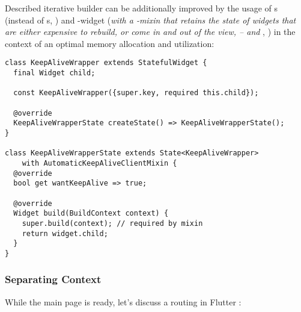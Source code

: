 \hspace{0.5cm}
\hspace{1cm}

\noindent Described iterative builder can be additionally improved by the usage of s (instead of s, 
) and -widget (\emph{with a -mixin that retains the 
state of widgets that are either expensive to rebuild, or come in and out of the view, --  and 
}, ) in the context of an optimal memory allocation and utilization:

\begin{lstlisting}
class KeepAliveWrapper extends StatefulWidget {
  final Widget child;

  const KeepAliveWrapper({super.key, required this.child});

  @override
  KeepAliveWrapperState createState() => KeepAliveWrapperState();
}

class KeepAliveWrapperState extends State<KeepAliveWrapper> 
    with AutomaticKeepAliveClientMixin {
  @override
  bool get wantKeepAlive => true;

  @override
  Widget build(BuildContext context) {
    super.build(context); // required by mixin
    return widget.child;
  }
}
\end{lstlisting}


\subsubsection{Separating Context}

\noindent While the main page is ready, let's discuss a routing in Flutter :

